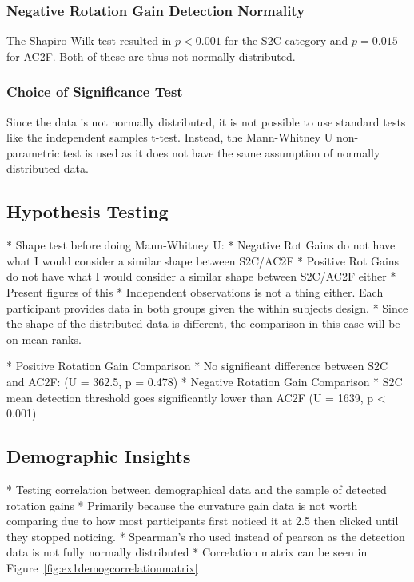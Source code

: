 \subsubsection{Negative Rotation Gain Detection Normality}
The Shapiro-Wilk test resulted in $p < 0.001$ for the S2C category and $p = 0.015$ for AC2F. Both of these are thus not normally distributed.  

\subsubsection{Choice of Significance Test}
Since the data is not normally distributed, it is not possible to use standard tests like the independent samples t-test. Instead, the Mann-Whitney U non-parametric test is used as it does not have the same assumption of normally distributed data. 
   
\subsection{Hypothesis Testing}
* Shape test before doing Mann-Whitney U:
   * Negative Rot Gains do not have what I would consider a similar shape between S2C/AC2F
   * Positive Rot Gains do not have what I would consider a similar shape between S2C/AC2F either
   * Present figures of this
* Independent observations is not a thing either. Each participant provides data in both groups given the within subjects design.
* Since the shape of the distributed data is different, the comparison in this case will be on mean ranks. 

* Positive Rotation Gain Comparison
   * No significant difference between S2C and AC2F: (U = 362.5, p = 0.478)
* Negative Rotation Gain Comparison
   * S2C mean detection threshold goes significantly lower than AC2F (U = 1639, p < 0.001)
   


\subsection{Demographic Insights}
* Testing correlation between demographical data and the sample of detected rotation gains
   * Primarily because the curvature gain data is not worth comparing due to how most participants first noticed it at 2.5 then clicked until they stopped noticing. 
* Spearman's rho used instead of pearson as the detection data is not fully normally distributed
* Correlation matrix can be seen in Figure~\ref{fig:ex1demogcorrelationmatrix}

